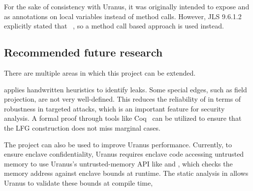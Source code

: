 For the sake of consistency with Uranus,
it was originally intended to expose  and 
as annotations on local variables instead of method calls.
However, \ac{JLS} 9.6.1.2 explicitly stated that
~\cite{jls},
so a method call based approach is used instead.

\subsection{Recommended future research}\label{subsec:recommended-future-research}
There are multiple areas in which this project can be extended.

\pname{} applies handwritten heuristics to identify leaks.
Some special edges, such as field projection, are not very well-defined.
This reduces the reliability of \pname{} in terms of robustness in targeted attacks,
which is an important feature for security analysis.
A formal proof through tools like Coq~\cite{coq}
can be utilized to ensure that the \ac{LFG} construction does not miss marginal cases.

The project can also be used to improve Uranus performance.
Currently, to ensure enclave confidentiality,
Uranus requires enclave code accessing untrusted memory to
use Uranus's untrusted-memory \ac{API}
like  and \cite{uranus},
which checks the memory address against enclave bounds at runtime.
The static analysis in \pname{} allows Uranus to validate these bounds at compile time,

